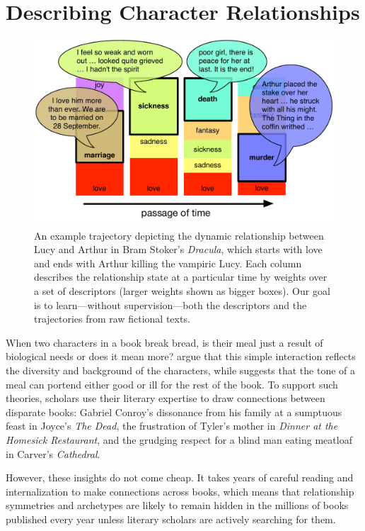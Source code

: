 \section{Describing Character Relationships}
\label{sec:introduction}

\begin{figure}[t!]
\includegraphics[width=1.0\linewidth]{2016_naacl_relationships/figures/lucy_and_arthur.pdf}
\caption{An example trajectory depicting the dynamic relationship between Lucy
  and Arthur in Bram Stoker's \textit{Dracula}, which starts with love and ends
  with Arthur killing the vampiric Lucy. Each column describes the relationship
  state at a particular time by weights over a set of descriptors (larger
  weights shown as bigger boxes). Our goal is to learn---without
  supervision---both the descriptors and the trajectories from raw fictional
  texts.}
\label{fig:traj}
\end{figure}

When two characters in a book break bread, is their meal just a result
of biological needs or does it mean more?
 argue that this simple interaction reflects
the diversity and background of the characters, while
 suggests that the tone of a meal can portend
either good or ill for the rest of the book. To support such theories,
scholars use their literary expertise to draw connections
between disparate books: Gabriel Conroy's dissonance from his family
at a sumptuous feast in Joyce's \emph{The Dead}, the frustration of
Tyler's mother in \emph{Dinner at the Homesick Restaurant}, and the
grudging respect for a blind man eating meatloaf in Carver's
\emph{Cathedral}.




However, these insights do not come cheap.  It takes years of careful
reading and internalization to make connections across
books, which means that relationship symmetries and archetypes are
likely to remain hidden in the millions of books published every year
unless literary scholars are actively searching for them.


